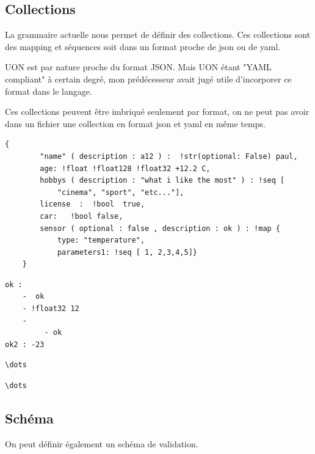 \documentclass[
    iict, %
    il, %
]{heig-tb}
\begin{document}
\subsection{Collections}
La grammaire actuelle nous permet de définir des collections. Ces collections sont des mapping et séquences soit dans un format proche de json ou de yaml.

UON est par nature proche du format JSON. Mais UON étant "YAML compliant" à certain degré, mon prédécesseur avait jugé utile d'incorporer ce format
dans le langage.

Ces collections peuvent être imbriqué seulement par format, on ne peut pas avoir dans un fichier une collection en format json et yaml en même temps.

\begin{lstlisting}[frame=single,caption={Exemple d'un mapping en format JSON},captionpos=b,label={json-map}]
    {
        "name" ( description : a12 ) :  !str(optional: False) paul,
        age: !float !float128 !float32 +12.2 C,
        hobbys ( description : "what i like the most" ) : !seq [
            "cinema", "sport", "etc..."],
        license  :  !bool  true,
        car:   !bool false,
        sensor ( optional : false , description : ok ) : !map {
            type: "temperature",
            parameters1: !seq [ 1, 2,3,4,5]}
    }
\end{lstlisting}

\begin{lstlisting}[frame=single,caption={Exemple d'un mapping en format YAML},captionpos=b,label={yaml-map}]
ok :
    -  ok
    - !float32 12
    -
         - ok
ok2 : -23
\end{lstlisting}

\begin{lstlisting}[frame=single,caption={Exemple d'une séquence en format JSON},captionpos=b,label={json-seq}]
\dots
\end{lstlisting}


\begin{lstlisting}[frame=single,caption={Exemple d'une séquence en format YAML},captionpos=b,label={yaml-seq}]
\dots
\end{lstlisting}

\subsection{Schéma}
On peut définir également un schéma de validation.
\end{document}

